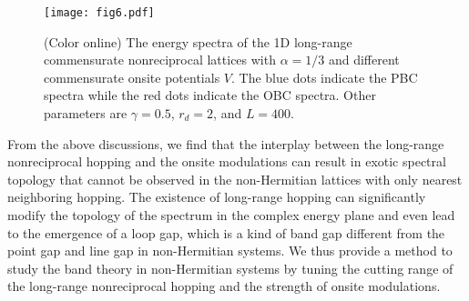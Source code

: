 \documentclass[prb,aps,twocolumn,showpacs]{revtex4-2} %
\begin{document}
\begin{figure}[t]
  \texttt{[image: fig6.pdf]}
  \caption{(Color online) The energy spectra of the 1D long-range commensurate nonreciprocal lattices with $\alpha=1/3$ and different commensurate onsite potentials $V$. The blue dots indicate the PBC spectra while the red dots indicate the OBC spectra. Other parameters are $\gamma=0.5$, $r_d=2$, and $L=400$.}
\label{fig6}
\end{figure} 

From the above discussions, we find that the interplay between the long-range nonreciprocal hopping and the onsite modulations can result in exotic spectral topology that cannot be observed in the non-Hermitian lattices with only nearest neighboring hopping. The existence of long-range hopping can significantly modify the topology of the spectrum in the complex energy plane and even lead to the emergence of a loop gap, which is a kind of band gap different from the point gap and line gap in non-Hermitian systems. We thus provide a method to study the band theory in non-Hermitian systems by tuning the cutting range of the long-range nonreciprocal hopping and the strength of onsite modulations.
\end{document}
